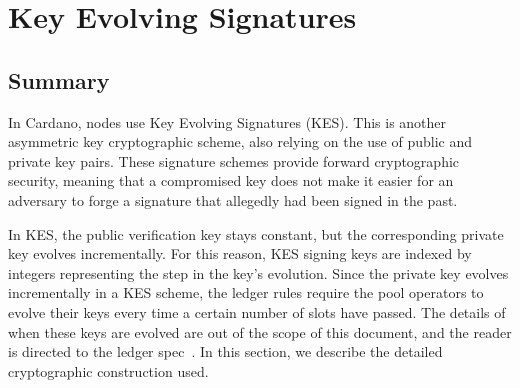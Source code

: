 \section{Key Evolving Signatures}
\label{sec:kes}

\subsection{Summary}
In Cardano, nodes use Key Evolving Signatures (KES).
This is another asymmetric key cryptographic scheme, also relying on
the use of public and private key pairs.
These signature schemes provide forward cryptographic security, meaning that a
compromised key does not make it easier for an adversary to forge a signature that
allegedly had been signed in the past.

In KES, the public verification key stays constant, but the
corresponding private key evolves incrementally. For this reason, KES
signing keys are indexed by integers representing the step in the key's
evolution. Since the private key evolves incrementally in a KES scheme, the ledger rules
require the pool operators to evolve their keys every time a certain number of
slots have passed. The details of when these keys are evolved are out of the
scope of this document, and the reader is directed to the ledger spec~\cite{ledgerspec}.
In this section, we describe the detailed cryptographic construction used.

